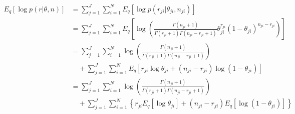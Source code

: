 \documentclass[11pt,reqno]{amsart}
\begin{document}
\begin{equation}
\begin{split}
\label{r}
E_q \left[ \log p\left(r | \theta, n \right)\right] &= \sum_{j=1}^{J} \sum_{i=1}^{N} E_q  \left[ \log p \left( r_{ji} | \theta_{ji}, n_{ji} \right) \right] \\
&= \sum_{j=1}^{J} \sum_{i=1}^{N}  E_q  \left[ \log \left( \frac{ \Gamma(n_{ji}+1) } { \Gamma(r_{ji}+1) \Gamma( n_{ji} - r_{ji} + 1 ) } \theta_{ji}^{r_{ji}} (1 - \theta_{ji})^{n_{ji} - r_{ji}} \right) \right] \\
%
&= \sum_{j=1}^{J} \sum_{i=1}^{N} \log \left( \frac{ \Gamma(n_{ji}+1) } { \Gamma(r_{ji}+1) \Gamma( n_{ji} - r_{ji} + 1 ) }\right)  \\
&\quad + \sum_{j=1}^{J} \sum_{i=1}^{N}  E_q  \left[ r_{ji} \log \theta_{ji} + (n_{ji} - r_{ji}) \log (1 - \theta_{ji}) \right] \\
&= \sum_{j=1}^{J} \sum_{i=1}^{N} \log \left( \frac{ \Gamma(n_{ji}+1) } { \Gamma(r_{ji}+1) \Gamma( n_{ji} - r_{ji} + 1 ) }\right)  \\
&\quad + \sum_{j=1}^{J} \sum_{i=1}^{N} \left\lbrace r_{ji} E_q \left[ \log \theta_{ji} \right] + (n_{ji} - r_{ji}) E_q  \left[  \log (1 - \theta_{ji}) \right] \right\rbrace \\
\end{split}
\end{equation}
\end{document}
